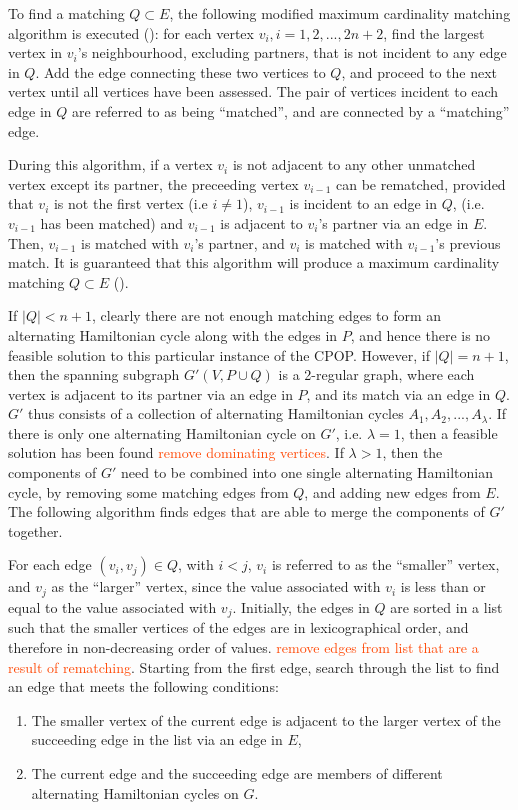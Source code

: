\documentclass[oribibl]{llncs}
\begin{document}
To find a matching $Q \subset E$, the following modified maximum cardinality matching algorithm is executed (\citealp{mahadev1994, becker2010}): for each vertex $v_i, i = 1, 2,...,2n+2$, find the largest vertex in $v_i$'s neighbourhood, excluding partners, that is not incident to any edge in $Q$. Add the edge connecting these two vertices to $Q$, and proceed to the next vertex until all vertices have been assessed. The pair of vertices incident to each edge in $Q$ are referred to as being ``matched'', and are connected by a ``matching'' edge. 

During this algorithm, if a vertex $v_i$ is not adjacent to any other unmatched vertex except its partner, the preceeding vertex $v_{i-1}$ can be rematched, provided that $v_i$ is not the first vertex (i.e $i \neq 1$), $v_{i-1}$ is incident to an edge in $Q$, (i.e. $v_{i-1}$ has been matched) and $v_{i-1}$ is adjacent to $v_i$'s partner via an edge in $E$. Then, $v_{i-1}$ is matched with $v_i$'s partner, and $v_i$ is matched with $v_{i-1}$'s previous match. It is guaranteed that this algorithm will produce a maximum cardinality matching $Q \subset E$ (\citealp{becker2010}).

If $|Q| < n+1$, clearly there are not enough matching edges to form an alternating Hamiltonian cycle along with the edges in $P$, and hence there is no feasible solution to this particular instance of the CPOP. However, if $|Q| = n+1$, then the spanning subgraph $G'(V, P \cup Q)$ is a 2-regular graph, where each vertex is adjacent to its partner via an edge in $P$, and its match via an edge in $Q$. $G'$ thus consists of a collection of alternating Hamiltonian cycles $A_1, A_2, ..., A_{\lambda}$. If there is only one alternating Hamiltonian cycle on $G'$, i.e. $\lambda = 1$, then a feasible solution has been found \textcolor{OrangeRed}{remove dominating vertices}. If $\lambda > 1$, then the components of $G'$ need to be combined into one single alternating Hamiltonian cycle, by removing some matching edges from $Q$, and adding new edges from $E$. The following algorithm finds edges that are able to merge the components of $G'$ together.

For each edge $(v_i, v_j) \in Q$, with $i < j$, $v_i$ is referred to as the ``smaller'' vertex, and $v_j$ as the ``larger'' vertex, since the value associated with $v_i$ is less than or equal to the value associated with $v_j$. Initially, the edges in $Q$ are sorted in a list such that the smaller vertices of the edges are in lexicographical order, and therefore in non-decreasing order of values. \textcolor{OrangeRed}{remove edges from list that are a result of rematching}. Starting from the first edge, search through the list to find an edge that meets the following conditions:
\begin{enumerate}
	\item The smaller vertex of the current edge is adjacent to the larger vertex of the succeeding edge in the list via an edge in $E$,
	\item The current edge and the succeeding edge are members of different alternating Hamiltonian cycles on $G$.
\end{enumerate}
\end{document}
